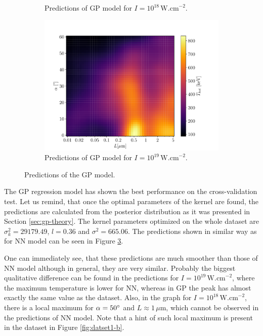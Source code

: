 \begin{figure}[ht]
\begin{subfigure}{0.49\textwidth}
		\caption{Predictions of GP model for $I = 10^{18} \, \mathrm{W.cm}^{-2}$.}
		\label{fig:gp-pred-b}
	\end{subfigure}
	\begin{subfigure}{0.49\textwidth}
		\centering
		\includegraphics[width=\textwidth]{figures/gp19_pred}
		\caption{Predictions of GP model for $I = 10^{19} \, \mathrm{W.cm}^{-2}$.}
		\label{fig:gp-pred-c}
	\end{subfigure}
	\caption{Predictions of the GP model.}
	\label{fig:gp-pred}
\end{figure}

The GP regression model has shown the best performance on the cross-validation test. Let us remind, that once the optimal parameters of the kernel are found, the predictions are calculated from the posterior distribution as it was presented in Section \ref{sec:gp-theory}. The kernel parameters optimized on the whole dataset are $\sigma_k^2 =29179.49$, $l = 0.36$ and $\sigma^2 = 665.06$. The predictions shown in similar way as for NN model can be seen in Figure \ref{fig:gp-pred}.

One can immediately see, that these predictions are much smoother than those of NN model although in general, they are very similar. Probably the biggest qualitative difference can be found in the predictions for $I = 10^{19} \, \mathrm{W.cm}^{-2}$, where the maximum temperature is lower for NN, whereas in GP the peak has almost exactly the same value as the dataset. Also, in the graph for $I = 10^{18} \, \mathrm{W.cm}^{-2}$, there is a local maximum for $\alpha = 50\degree$ and $L \approx 1 \, \mu\mathrm{m}$, which cannot be observed in the predictions of NN model. Note that a hint of such local maximum is present in the dataset in Figure \ref{fig:datset1-b}.

